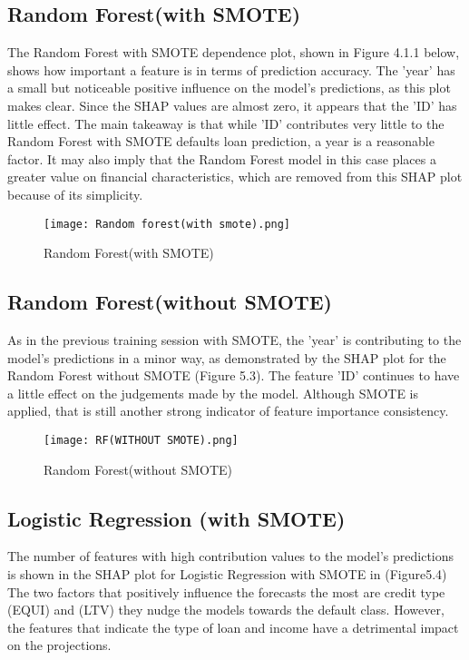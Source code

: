 \documentclass[12pt, a4paper,oneside]{book}
\numberwithin{equation}{section}
\begin{document}
\subsection{Random Forest(with SMOTE)}
The Random Forest with SMOTE dependence plot, shown in Figure 4.1.1 below, shows how important a feature is in terms of prediction accuracy. The 'year' has a small but noticeable positive influence on the model's predictions, as this plot makes clear. Since the SHAP values are almost zero, it appears that the 'ID' has little effect.
The main takeaway is that while 'ID' contributes very little to the Random Forest with SMOTE defaults loan prediction, a year is a reasonable factor. It may also imply that the Random Forest model in this case places a greater value on financial characteristics, which are removed from this SHAP plot because of its simplicity.


\begin{figure}[ht]
    \centering
    \texttt{[image: Random forest(with smote).png]}
    \caption{Random Forest(with SMOTE)}
    \label{fig:enter-label}
\end{figure}

\newpage
\subsection{Random Forest(without SMOTE)}
As in the previous training session with SMOTE, the 'year' is contributing to the model's predictions in a minor way, as demonstrated by the SHAP plot for the Random Forest without SMOTE (Figure 5.3). The feature 'ID' continues to have a little effect on the judgements made by the model. Although SMOTE is applied, that is still another strong indicator of feature importance consistency.
\begin{figure}[ht]
    \centering
    \texttt{[image: RF(WITHOUT SMOTE).png]}
    \caption{Random Forest(without SMOTE)}
    \label{fig:enter-label}
\end{figure}

\newpage
\subsection{Logistic Regression (with SMOTE)}
The number of features with high contribution values to the model's predictions is shown in the SHAP plot for Logistic Regression with SMOTE in (Figure5.4) The two factors that positively influence the forecasts the most are credit type (EQUI) and (LTV) they nudge the models towards the default class. However, the features that indicate the type of loan and income have a detrimental impact on the projections.
\end{document}
